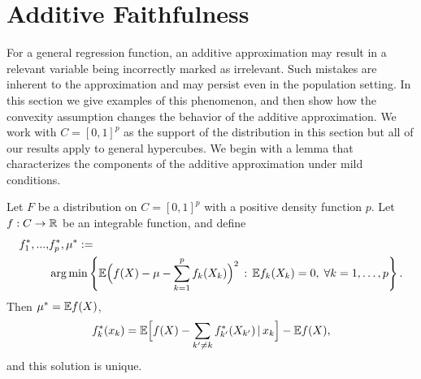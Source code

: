 
\section{Additive Faithfulness}
\label{sec:additivefaithful}

For a general regression function, an additive approximation may result in a
relevant variable being incorrectly marked as irrelevant. Such
mistakes are inherent to the approximation and may persist even in
the population setting.  In this section we give
examples of this phenomenon, and then show how the convexity
assumption
changes the behavior of the additive approximation. We work with $C=[0,1]^p$ as the support of the distribution in this section but all of our results apply to general hypercubes. We begin
with a lemma that characterizes the components of the additive approximation under mild conditions. 



\begin{lemma}
\label{lem:general_int_reduction}
Let $F$ be a distribution on $C=[0,1]^p$ with a positive density
function $p$. Let $f: C \rightarrow {\mathbb R}$ be an integrable function,
and define 
\begin{align*}
f^*_1,...,&f^*_p, \mu^* :=  \\
&\arg\min \left\{ {\mathbb E} \Bigl( f(X) - \mu - \sum_{k=1}^p f_k(X_k)\Bigr)^2 \,:\,
{\mathbb E} f_k(X_k) = 0,\; \forall k=1,\ldots, p \right\}.
\end{align*}
Then $\mu^* = {\mathbb E} f(X)$, 
\begin{equation}
\label{eq:backfit}
f^*_k(x_k) = {\mathbb E}\Bigl[ f(X) - \sum_{k' \neq k} f^*_{k'}(X_{k'}) {\,|\,}
x_k\Bigr] - {\mathbb E} f(X), 
\end{equation}
and this solution is unique.
\end{lemma}


